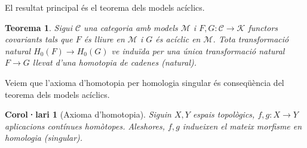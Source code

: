 \documentclass[compress]{article}
\newtheorem{corolari}{Corol·lari}
\newtheorem{teorema}{Teorema}
\theoremstyle{definition}
\begin{document}
El resultat principal és el teorema dels models acíclics.
\begin{teorema}
    Sigui $\mathscr{C}$ una categoria amb models $\mathscr{M}$ i $F,G:\mathscr{C}\rightarrow\mathscr{K}$ functors covariants tals que $F$ és lliure en $\mathscr{M}$ i $G$ és acíclic en $\mathscr{M}$. Tota transformació natural $H_{0}(F)\rightarrow H_{0}(G)$ ve induïda per una única transformació natural $F\rightarrow G$ llevat d'una homotopia de cadenes (natural).
\end{teorema}
Veiem que l'axioma d'homotopia per homologia singular és conseqüència del teorema dels models acíclics.
\begin{corolari}[Axioma d'homotopia]
    Siguin $X,Y$ espais topològics, $f,g:X\rightarrow Y$ aplicacions contínues homòtopes. Aleshores, $f,g$ indueixen el mateix morfisme en homologia (singular).
\end{corolari}
\end{document}
